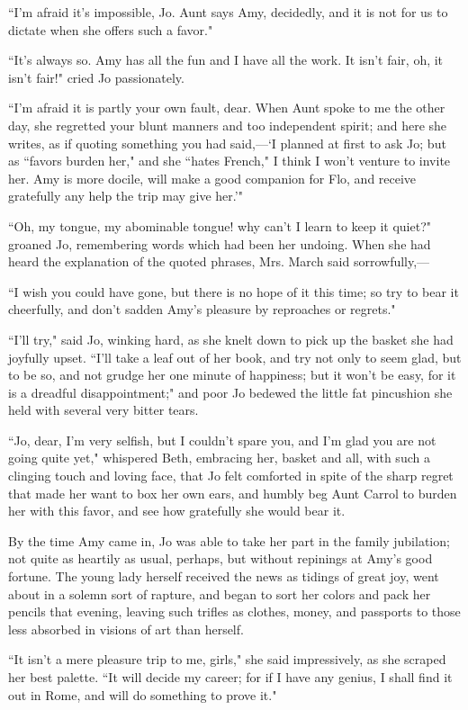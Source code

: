 ``I'm afraid it's impossible, Jo. Aunt
says Amy, decidedly, and it is not for us to dictate when she offers
such a favor."

``It's always so. Amy has all the fun and I have all the
work. It isn't fair, oh, it isn't fair!"
cried Jo passionately.

``I'm afraid it is partly your own fault, dear. When Aunt
spoke to me the other day, she regretted your blunt manners and too
independent spirit; and here she writes, as if quoting something you had
said,---`I planned at first to ask Jo; but as ``favors
burden her," and she ``hates French," I think I won't
venture to invite her. Amy is more docile, will make a good companion
for Flo, and receive gratefully any help the trip may give
her.'"

``Oh, my tongue, my abominable tongue! why can't I learn
to keep it quiet?" groaned Jo, remembering words which had been her
undoing. When she had heard the explanation of the quoted phrases, Mrs.
March said sorrowfully,---

``I wish you could have gone, but there is no hope of it this time; so
try to bear it cheerfully, and don't sadden
Amy's pleasure by reproaches or regrets."

``I'll try," said Jo, winking hard, as she knelt down to
pick up the basket she had joyfully upset. ``I'll take a
leaf out of her book, and try not only to seem glad, but to be so, and
not grudge her one minute of happiness; but it won't be
easy, for it is a dreadful disappointment;" and poor Jo bedewed the
little fat pincushion she held with several very bitter tears.

``Jo, dear, I'm very selfish, but I
couldn't spare you, and I'm glad you are
not going quite yet," whispered Beth, embracing her, basket and all,
with such a clinging touch and loving face, that Jo felt comforted in
spite of the sharp regret that made her want to box her own ears, and
humbly beg Aunt Carrol to burden her with this favor, and see how
gratefully she would bear it.

By the time Amy came in, Jo was able to take her part in the family
jubilation; not quite as heartily as usual, perhaps, but without
repinings at Amy's good fortune. The young lady herself
received the news as tidings of great joy, went about in a solemn sort
of rapture, and began to sort her colors and pack her pencils that
evening, leaving such trifles as clothes, money, and passports to those
less absorbed in visions of art than herself.

``It isn't a mere pleasure trip to me, girls," she said
impressively, as she scraped her best palette. ``It will decide my
career; for if I have any genius, I shall find it out in Rome, and will
do something to prove it."

